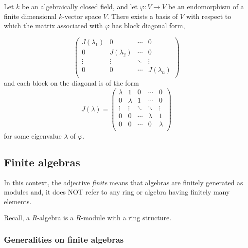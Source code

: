\documentclass[12pt, a4paper]{article}
\begin{document}
\begin{corollary}
Let \( k \) be an algebraically closed field, and let \( \varphi : V \to V \) be an endomorphism of a finite dimensional \( k \)-vector space \( V \). There exists a basis of \( V \) with respect to which the matrix associated with \( \varphi \) has block diagonal form,

\[
\begin{pmatrix}
J(\lambda_1) & 0 & \cdots & 0 \\
0 & J(\lambda_2) & \cdots & 0 \\
\vdots & \vdots & \ddots & \vdots \\
0 & 0 & \cdots & J(\lambda_n) \\
\end{pmatrix}
\]
and each block on the diagonal is of the form
\[
J(\lambda) = 
\begin{pmatrix}
\lambda & 1 & 0 & \cdots & 0 \\
0 & \lambda & 1 & \cdots & 0 \\
\vdots & \vdots & \ddots & \ddots & \vdots \\
0 & 0 & \cdots & \lambda & 1 \\
0 & 0 & \cdots & 0 & \lambda \\
\end{pmatrix}
\]
for some eigenvalue \( \lambda \) of \( \varphi \).

\end{corollary}

\subsection{Finite algebras}

\begin{mdremark}
    In this context, the adjective \textit{finite} means that algebras are finitely generated as modules and, it does NOT refer to any ring or algebra having finitely many elements.
\end{mdremark}

\begin{mdnote}
    Recall, a \(R\)-algebra is a \(R\)-module with a ring structure.
\end{mdnote}

\subsubsection{Generalities on finite algebras}
\end{document}
